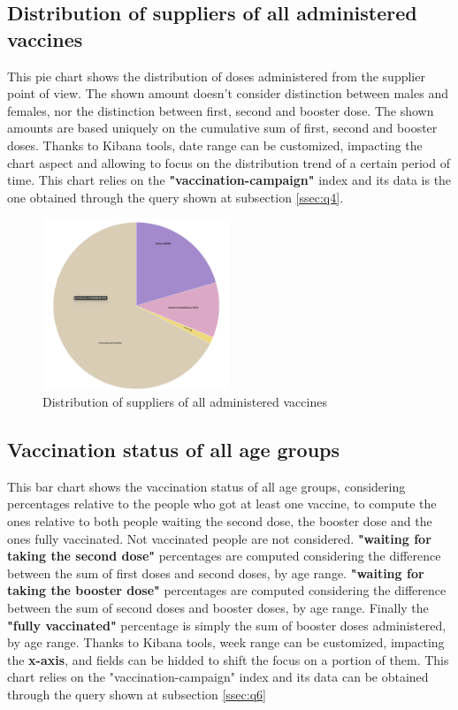 \documentclass{article}[IEEEtran]
\begin{document}
\newpage

\subsection{Distribution of suppliers of all administered vaccines}\label{ssec:dash5}

This pie chart shows the distribution of doses administered from the supplier point of view. The shown amount doesn't consider distinction between males and females, nor the distinction between first, second and booster dose. The shown amounts are based uniquely on the cumulative sum of first, second and booster doses. 
Thanks to Kibana tools, date range can be customized, impacting the chart aspect and allowing to focus on the distribution trend of a certain period of time. This chart relies on the \textbf{"vaccination-campaign"} index and its data is the one obtained through the query shown at subsection \ref{ssec:q4}. 

\begin{figure}[H]
\begin{center}
    \includegraphics[width=0.5\textwidth, frame]{Distribution of suppliers of all administered vaccines.png}
    \caption{Distribution of suppliers of all administered vaccines}
\end{center}
\end{figure}

\subsection{Vaccination status of all age groups}\label{ssec:dash6}

This bar chart shows the vaccination status of all age groups, considering percentages relative to the people who got at least one vaccine, to compute the ones relative to both people waiting the second dose, the booster dose and the ones fully vaccinated. Not vaccinated people are not considered. \textbf{"waiting for taking the second dose"} percentages are computed considering the difference between the sum of first doses and second doses, by age range. \textbf{"waiting for taking the booster dose"} percentages are computed considering the difference between the sum of second doses and booster doses, by age range. Finally the \textbf{"fully vaccinated"} percentage is simply the sum of booster doses administered, by age range. 
Thanks to Kibana tools, week range can be customized, impacting the \textbf{x-axis}, and fields can be hidded to shift the focus on a portion of them.
This chart relies on the "vaccination-campaign" index and its data can be obtained through the query shown at subsection \ref{ssec:q6}
\end{document}
